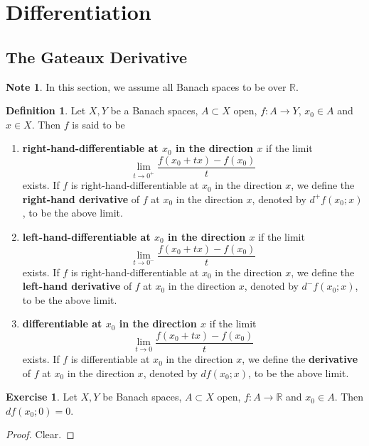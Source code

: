 \documentclass[12pt]{amsart}
\theoremstyle{definition}
\newtheorem{defn}[definition]{Definition}
\newtheorem{note}[definition]{Note}
\newtheorem{ex}[definition]{Exercise}
\newcommand{\R}{\mathbb{R}}
\newcommand{\lex}[1]{\label{ex:#1}}
\newcommand{\ld}[1]{\label{defn:#1}}
\begin{document}
	
	\newpage
	\section{Differentiation}
	
	\subsection{The Gateaux Derivative}
	
	\begin{note}
	In this section, we assume all Banach spaces to be over $\R$. 
	\end{note}
	
	\begin{defn} \ld{61001}
	Let $X,Y$ be a Banach spaces, $A \subset X$ open, $f:A \rightarrow Y$, $x_0 \in A$ and $x \in X$. Then $f$ is said to be 
	\begin{enumerate}
	\item \textbf{right-hand-differentiable at $x_0$ in the direction $x$} if the limit
	$$  \lim_{t \rightarrow 0^+} \frac{f(x_0 +tx) - f(x_0)}{t}$$
	exists. If $f$ is right-hand-differentiable at $x_0$ in the direction $x$, we define the \textbf{right-hand derivative} of $f$ at $x_0$ in the direction $x$, denoted by  $d^+ f(x_0; x)$, to be the above limit. 
	
	\item \textbf{left-hand-differentiable at $x_0$ in the direction $x$} if the limit
	$$  \lim_{t \rightarrow 0^-} \frac{f(x_0 +tx) - f(x_0)}{t}$$
	exists. If $f$ is right-hand-differentiable at $x_0$ in the direction $x$, we define the \textbf{left-hand derivative} of $f$ at $x_0$ in the direction $x$, denoted by  $d^- f(x_0; x)$, to be the above limit. 
	
	\item \textbf{differentiable at $x_0$ in the direction $x$} if the limit
	$$  \lim_{t \rightarrow 0} \frac{f(x_0 +tx) - f(x_0)}{t}$$
	exists. If $f$ is differentiable at $x_0$ in the direction $x$, we define the \textbf{derivative} of $f$ at $x_0$ in the direction $x$, denoted by $d f(x_0; x)$, to be the above limit. 
	\end{enumerate}
	\end{defn}	
	
	\begin{ex} \lex{61002}
	Let $X, Y$ be Banach spaces, $A \subset X$ open, $f:A \rightarrow \R$ and $x_0 \in A$. Then $df(x_0; 0) = 0$.
	\end{ex}
	
	\begin{proof}
	Clear.
	\end{proof}
	
\end{document}
